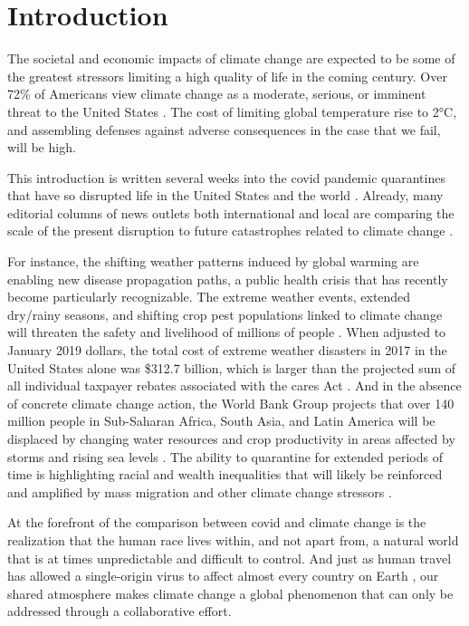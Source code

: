 \chapter{Introduction}
\label{sec:intro}

The societal and economic impacts of climate change are expected to be some of the greatest stressors limiting a high quality of life in the coming century. Over 72\% of Americans view climate change as a moderate, serious, or imminent threat to the United States \cite{caspani}. The cost of limiting global temperature rise to 2\si{\celsius}, and assembling defenses against adverse consequences in the case that we fail, will be high. 

This introduction is written several weeks into the \gls{covid} pandemic quarantines that have so disrupted life in the United States and the world \cite{newsom,italy,india}. Already, many editorial columns of news outlets both international and local are comparing the scale of the present disruption to future catastrophes related to climate change \cite{wallace_wells,wyns,rosebrugh}. 

For instance, the shifting weather patterns induced by global warming are enabling new disease propagation paths, a public health crisis that has recently become particularly recognizable. The extreme weather events, extended dry/rainy seasons, and shifting crop pest populations linked to climate change will threaten the safety and livelihood of millions of people \cite{ahmed, smith_disasters}. When adjusted to January 2019 dollars, the total cost of extreme weather disasters in 2017 in the United States alone was \$312.7 billion, which is larger than the projected sum of all individual taxpayer rebates associated with the \gls{cares} Act \cite{smith_disasters,watson}. And in the absence of concrete climate change action, the World Bank Group projects that over 140 million people in Sub-Saharan Africa, South Asia, and Latin America will be displaced by changing water resources and crop productivity in areas affected by storms and rising sea levels \cite{wbg}. The ability to quarantine for extended periods of time is highlighting racial and wealth inequalities that will likely be reinforced and amplified by mass migration and other climate change stressors \cite{howell}.

At the forefront of the comparison between \gls{covid} and climate change is the realization that the human race lives within, and not apart from, a natural world that is at times unpredictable and difficult to control. And just as human travel has allowed a single-origin virus to affect almost every country on Earth \cite{who}, our shared atmosphere makes climate change a global phenomenon that can only be addressed through a collaborative effort. 

